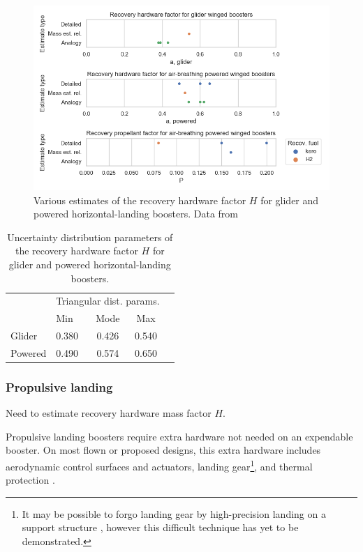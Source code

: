 \documentclass[conf]{../new-aiaa}
\begin{document}
\begin{figure}[hbt!]
    \centering
    \includegraphics[width=1\textwidth]{recov_strats/winged_perf_factors}
    \caption{\label{fig:winged_perf_factors} Various estimates of the recovery hardware factor $H$ for glider and powered horizontal-landing boosters. Data from \cite{Hellman2005, Isakowitz2004, Healy1998, Sippel2003}}
\end{figure}

\begin{table}[hbt!]
    \centering
    \caption{\label{tab:winged_pref_factor_distributions} Uncertainty distribution parameters of the recovery hardware factor $H$ for glider and powered horizontal-landing boosters.}
    \begin{tabular}{l l c c c}
    \hline
     & \multicolumn{3}{c}{Triangular dist. params.} \\
    & Min & Mode & Max \\
    \hline
    \hline
    Glider  & 0.380 & 0.426 & 0.540 \\
    Powered & 0.490 & 0.574 & 0.650 \\
    \hline
    \end{tabular}
\end{table}

\subsubsection{Propulsive landing}

Need to estimate recovery hardware mass factor $H$.

Propulsive landing boosters require extra hardware not needed on an expendable booster. On most flown or proposed designs, this extra hardware includes aerodynamic control surfaces and actuators, landing gear\footnote{It may be possible to forgo landing gear by high-precision landing on a support structure \cite{Musk2017}, however this difficult technique has yet to be demonstrated.}, and thermal protection \cite{NewGlenn, Falcon9, DCX, Musk2017}.
\end{document}
